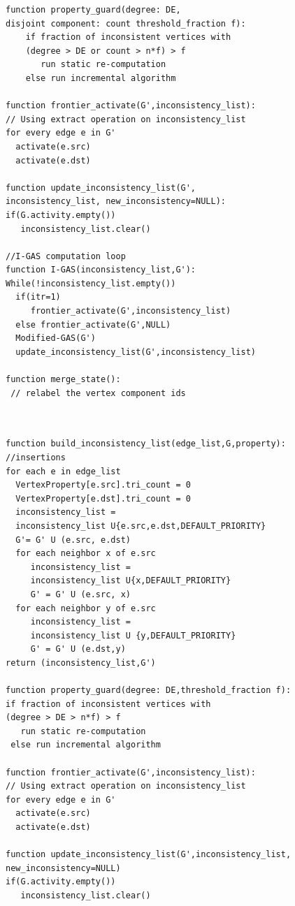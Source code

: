 \begin{figure}[!htb]
\begin{minipage}{0.5\columnwidth}
\begin{lstlisting}[caption=\textbf{Connected Components  in EvoGraph.}, captionpos='b',label={lst:mm_cc}, basicstyle={\tiny\sffamily\bfseries},numberstyle=\tiny]
function property_guard(degree: DE,
disjoint component: count threshold_fraction f):
    if fraction of inconsistent vertices with 
    (degree > DE or count > n*f) > f
       run static re-computation 
    else run incremental algorithm

function frontier_activate(G',inconsistency_list):
// Using extract operation on inconsistency_list
for every edge e in G'
  activate(e.src)
  activate(e.dst)

function update_inconsistency_list(G',
inconsistency_list, new_inconsistency=NULL):
if(G.activity.empty())
   inconsistency_list.clear()

//I-GAS computation loop 
function I-GAS(inconsistency_list,G'):
While(!inconsistency_list.empty())
  if(itr=1)
     frontier_activate(G',inconsistency_list)
  else frontier_activate(G',NULL)
  Modified-GAS(G')
  update_inconsistency_list(G',inconsistency_list) 

function merge_state():
 // relabel the vertex component ids

  
\end{lstlisting}
\end{minipage}
\hfill
\begin{minipage}{0.5\columnwidth}
\begin{lstlisting}[caption=\textbf{Triangle Count in EvoGraph.}, captionpos='b',label={lst:mm_tc}, basicstyle={\tiny\sffamily\bfseries},numberstyle=\tiny]
function build_inconsistency_list(edge_list,G,property):
//insertions
for each e in edge_list
  VertexProperty[e.src].tri_count = 0
  VertexProperty[e.dst].tri_count = 0
  inconsistency_list = 
  inconsistency_list U{e.src,e.dst,DEFAULT_PRIORITY}
  G'= G' U (e.src, e.dst)
  for each neighbor x of e.src
     inconsistency_list = 
     inconsistency_list U{x,DEFAULT_PRIORITY}
     G' = G' U (e.src, x)
  for each neighbor y of e.src
     inconsistency_list = 
     inconsistency_list U {y,DEFAULT_PRIORITY}
     G' = G' U (e.dst,y)
return (inconsistency_list,G') 

function property_guard(degree: DE,threshold_fraction f):
if fraction of inconsistent vertices with 
(degree > DE > n*f) > f
   run static re-computation 
 else run incremental algorithm

function frontier_activate(G',inconsistency_list):
// Using extract operation on inconsistency_list
for every edge e in G'
  activate(e.src)
  activate(e.dst)

function update_inconsistency_list(G',inconsistency_list,
new_inconsistency=NULL)
if(G.activity.empty())
   inconsistency_list.clear()


\end{lstlisting}
\end{minipage}
\end{figure}
